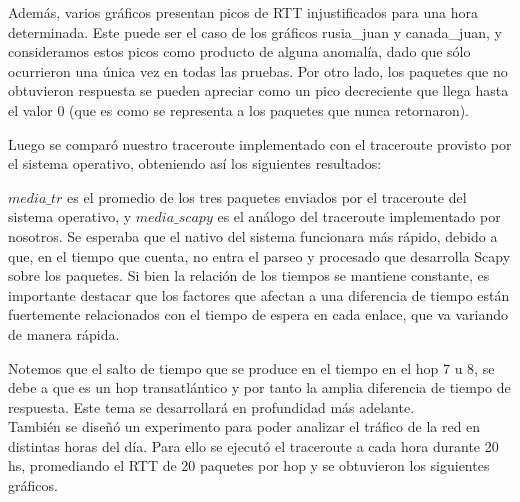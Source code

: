 Además, varios gráficos presentan picos de RTT injustificados para una hora determinada. Este puede ser el caso de los gráficos rusia_juan y canada_juan, y consideramos estos picos como producto de alguna anomalía, dado que sólo ocurrieron una única vez en todas las pruebas. Por otro lado, los paquetes que no obtuvieron respuesta se pueden apreciar como un pico decreciente que llega hasta el valor 0 (que es como se representa a los paquetes que nunca retornaron).


Luego se comparó nuestro traceroute implementado con el traceroute provisto por el sistema operativo, obteniendo así los siguientes resultados: 




$media\_tr$ es el promedio de los tres paquetes enviados por el traceroute del sistema operativo, y $media\_scapy$ es el an\'alogo del traceroute implementado por nosotros. Se esperaba que el nativo del sistema funcionara m\'as r\'apido, debido a que, en el tiempo que cuenta, no entra el parseo y procesado que desarrolla Scapy sobre los paquetes. Si bien la relaci\'on de los tiempos se mantiene constante, es importante destacar que los factores que afectan a una diferencia de tiempo están fuertemente relacionados con el tiempo de espera en cada enlace, que va variando de manera rápida. 

Notemos que el salto de tiempo que se produce en el tiempo en el hop 7 u 8, se debe a que es un hop transatl\'antico y por tanto la amplia diferencia de tiempo de respuesta. Este tema se desarrollará en profundidad más adelante. \\

Tambi\'en se dise\~nó un experimento para poder analizar el tr\'afico de la red en distintas horas del d\'ia. Para ello se ejecutó el traceroute a cada hora durante 20 hs, promediando el RTT de 20 paquetes por hop y se obtuvieron los siguientes gr\'aficos.




